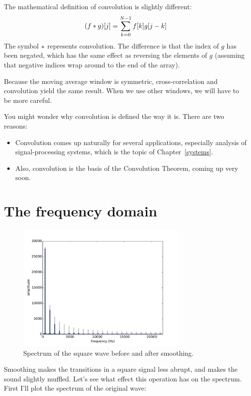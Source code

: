\documentclass[12pt]{book}
\begin{document}
The mathematical definition of convolution is slightly different:
%
\[ (f \ast g)[j] = \sum_{k=0}^{N-1} f[k] g[j-k]  \]
%
The symbol $\ast$ represents convolution.  The difference is
that the index of $g$ has been negated, which has the same
effect as reversing the elements of $g$ (assuming that negative
indices wrap around to the end of the array).

Because the moving average window is symmetric, cross-correlation and
convolution yield the same result.  When we use other windows, we will
have to be more careful.

You might wonder why convolution is defined the way it is.  There
are two reasons:

\begin{itemize}

\item Convolution comes up naturally for several applications,
especially analysis of signal-processing systems, which is
the topic of Chapter~\ref{systems}.

\item Also, convolution is the basis of the Convolution Theorem,
coming up very soon.

\end{itemize}


\section{The frequency domain}

\begin{figure}
\centerline{\includegraphics[height=2.5in]{figs/convolution4.pdf}}
\caption{Spectrum of the square wave before and after smoothing.}
\label{fig.convolution4}
\end{figure}

Smoothing makes the transitions in a square signal less abrupt,
and makes the sound slightly muffled.  Let's see what effect this
operation has on the spectrum.  First I'll plot the spectrum
of the original wave:
\end{document}
